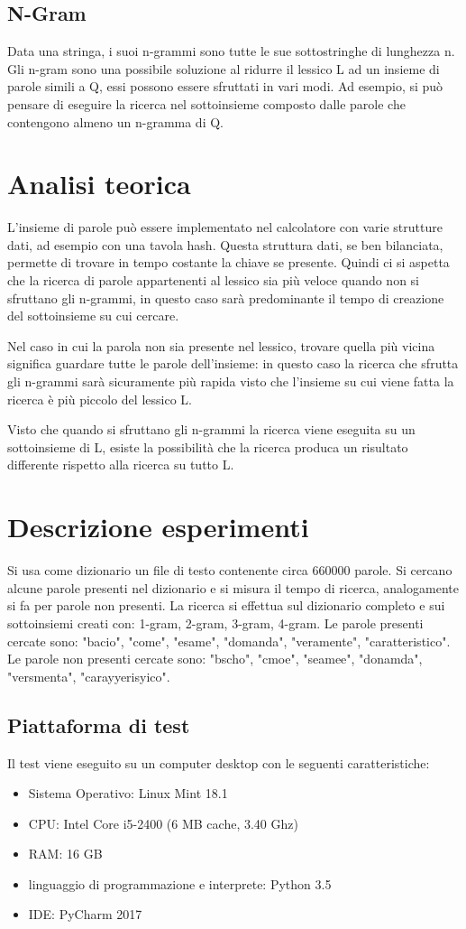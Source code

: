 \documentclass[]{article}
\begin{document}
\subsection*{N-Gram}
Data una stringa, i suoi n-grammi sono tutte le sue sottostringhe di lunghezza n.
Gli n-gram sono una possibile soluzione al ridurre il lessico L ad un insieme di parole simili a Q, essi possono essere sfruttati in vari modi.
Ad esempio, si può pensare di eseguire la ricerca nel sottoinsieme composto dalle parole che contengono almeno un n-gramma di Q.

\section{Analisi teorica}
L'insieme di parole può essere implementato nel calcolatore con varie strutture dati, ad esempio con una tavola hash. Questa struttura dati, se ben bilanciata, permette di trovare in tempo costante la chiave se presente.
Quindi ci si aspetta che la ricerca di parole appartenenti al lessico sia più veloce quando non si sfruttano gli n-grammi, in questo caso sarà predominante il tempo di creazione del sottoinsieme su cui cercare.

Nel caso in cui la parola non sia presente nel lessico, trovare quella più vicina significa guardare tutte le parole dell'insieme: in questo caso la ricerca che sfrutta gli n-grammi sarà sicuramente più rapida visto che l'insieme su cui viene fatta la ricerca è più piccolo del lessico L.

Visto che quando si sfruttano gli n-grammi la ricerca viene eseguita su un sottoinsieme di L, esiste la possibilità che la ricerca produca un risultato differente rispetto alla ricerca su tutto L.

\section{Descrizione esperimenti}
Si usa come dizionario un file di testo contenente circa 660000 parole.
Si cercano alcune parole presenti nel dizionario e si misura il tempo di ricerca, analogamente si fa per parole non presenti.
La ricerca si effettua sul dizionario completo e sui sottoinsiemi creati con: 1-gram, 2-gram, 3-gram, 4-gram.
Le parole presenti cercate sono: "bacio", "come", "esame", "domanda", "veramente", "caratteristico".
Le parole non presenti cercate sono: "bscho", "cmoe", "seamee", "donamda", "versmenta", "carayyerisyico".

\subsection*{Piattaforma di test}
Il test viene eseguito su un computer desktop con le seguenti caratteristiche:
\begin{itemize}
\item Sistema Operativo: Linux Mint 18.1
\item CPU: Intel Core i5-2400 (6 MB cache, 3.40 Ghz)
\item RAM: 16 GB
\item linguaggio di programmazione e interprete: Python 3.5
\item IDE: PyCharm 2017
\end{itemize}
\end{document}
